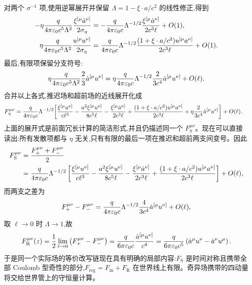 对两个 $\sigma^{-1}$ 项,使用逆幂展开并保留 $\Lambda=1-\xi\cdot a/c^2$ 的线性修正,得到
\begin{align*}
 -\eta{q\over4\pi\varepsilon_0c^5\Lambda^2}
 {\xi^{[\mu}\dot a^{\nu]}\over2\sigma_\eta}
 &=-{q\over4\pi\varepsilon_0c}
 \Lambda^{-1/2}
 {\xi^{[\mu}\dot a^{\nu]}\over2c^3\ell}
 +O(1),\\
 \eta{q\over4\pi\varepsilon_0c^5\Lambda^2}
 {u^{[\mu}a^{\nu]}\over2\sigma_\eta}
 &={q\over4\pi\varepsilon_0c}
 \Lambda^{-1/2}
 {(1+\xi\cdot a/c^2)u^{[\mu}a^{\nu]}\over2c^3\ell}
 +O(1).
\end{align*}
最后,有限项保留分支符号:
\begin{equation*}
 \eta{q\over4\pi\varepsilon_0c^5\Lambda^2}
 {2\over3}\dot a^{[\mu}u^{\nu]}
 =\eta{q\over4\pi\varepsilon_0c}
 \Lambda^{-1/2}
 {2\over3c^4}\dot a^{[\mu}u^{\nu]}
 +O(\ell).
\end{equation*}
合并以上各式,推迟场和超前场的近线展开化成
\begin{align*}
 F_\eta^{\mu\nu}
 ={q\over4\pi\varepsilon_0c}\Lambda^{-1/2}
 \bigg[{}&
 {\xi^{[\mu}u^{\nu]}\over c\ell^3}
 -{a^2\xi^{[\mu}u^{\nu]}\over8c^5\ell}
 -{\xi^{[\mu}\dot a^{\nu]}\over2c^3\ell}
 +{(1+\xi\cdot a/c^2)u^{[\mu}a^{\nu]}\over2c^3\ell}
 +\eta{2\over3c^4}\dot a^{[\mu}u^{\nu]}
 \bigg]+O(\ell).
\end{align*}
上面的展开式是前面冗长计算的简洁形式,并且仍描述同一个 $F_\eta^{\mu\nu}$。现在可以直接读出:所有发散项都与 $\eta$ 无关,只有有限的最后一项在推迟和超前两支间变号。因此
\begin{align*}
 F_{\mathrm S}^{\mu\nu}
 &={F_{+}^{\mu\nu}+F_{-}^{\mu\nu}\over2}\\
 &={q\over4\pi\varepsilon_0c}\Lambda^{-1/2}
 \left[
 {\xi^{[\mu}u^{\nu]}\over c\ell^3}
 -{a^2\xi^{[\mu}u^{\nu]}\over8c^5\ell}
 -{\xi^{[\mu}\dot a^{\nu]}\over2c^3\ell}
 +{(1+\xi\cdot a/c^2)u^{[\mu}a^{\nu]}\over2c^3\ell}
 \right]+O(\ell),
\end{align*}
而两支之差为
\begin{equation*}
 F_{+}^{\mu\nu}-F_{-}^{\mu\nu}
 ={q\over4\pi\varepsilon_0c}\Lambda^{-1/2}
 {4\over3c^4}\dot a^{[\mu}u^{\nu]}+O(\ell),
\end{equation*}
取 $\ell\to0$ 时 $\Lambda\to1$,故
\begin{equation*}
 F_{\mathrm R}^{\mu\nu}(z)
 ={1\over2}\lim_{\ell\to0}
 \left(F_{+}^{\mu\nu}-F_{-}^{\mu\nu}\right)
 ={q\over6\pi\varepsilon_0c}
 {\dot a^{[\mu}u^{\nu]}\over c^4}
 ={q\over6\pi\varepsilon_0c^5}
 \left(\dot a^\mu u^\nu-\dot a^\nu u^\mu\right).
\end{equation*}
于是同一个实际场的等价改写链现在具有明确的局部内容:$F_{\mathrm S}$ 是时间对称且携带全部 Coulomb 型奇性的部分,$F_{\mathrm{reg}}=F_{\mathrm{in}}+F_{\mathrm R}$ 在世界线上有限。奇异场携带的四动量将交给世界管上的守恒量计算。

